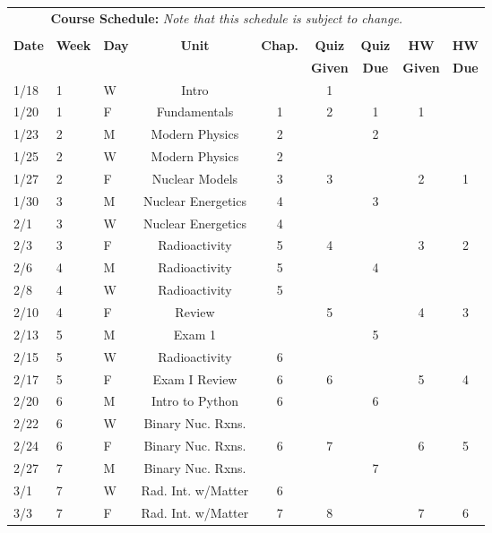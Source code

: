 \documentclass[11pt, a4paper]{article}
\begin{document}
\pagebreak
\FloatBarrier
\renewcommand{\arraystretch}{1}
\begin{table}[h]
\begin{center}
\begin{tabular}{lllcccccc}
\multicolumn{8}{c}{\textbf{Course Schedule:}\textit{ Note that this schedule is
subject to change.}}\\
&&&&&&&&\\
\textbf{Date} & \textbf{Week} & \textbf{Day} & \textbf{Unit} & \textbf{Chap.} & \textbf{Quiz}& \textbf{Quiz} & \textbf{HW} & \textbf{HW}\\
              &  &  &  &  & \textbf{Given} & \textbf{Due} & \textbf{Given} & \textbf{Due}\\ \hline
\hline
1/18 & 1 & W & Intro              &  & 1 &  &  & \\
1/20 & 1 & F & Fundamentals       & 1 & 2 & 1 & 1 &  \\
1/23 & 2 & M & Modern Physics     & 2 &   & 2 & &  \\
1/25 & 2 & W & Modern Physics     & 2 &   &  &  &  \\
1/27 & 2 & F & Nuclear Models     & 3 & 3 &  & 2 & 1  \\
1/30 & 3 & M & Nuclear Energetics & 4 &   & 3 & &  \\
2/1 & 3 & W & Nuclear Energetics  & 4 &   &  &  &  \\
2/3 & 3 & F & Radioactivity       & 5 & 4 &  & 3 & 2 \\
2/6 & 4 & M & Radioactivity       & 5 &   & 4 &  &  \\
2/8 & 4 & W & Radioactivity       & 5 &   &  &  &  \\
2/10 & 4 & F & Review             &   & 5 &  & 4 & 3 \\
2/13 & 5 & M & Exam 1             &   &   & 5  &  &  \\
2/15 & 5 & W & Radioactivity  & 6 &   &  &  &  \\
2/17 & 5 & F & Exam I Review  & 6 & 6 &  & 5 & 4 \\
2/20 & 6 & M & Intro to Python  & 6 &   & 6 &  &  \\
2/22 & 6 & W & Binary Nuc. Rxns.      &  &  &  &  &  \\
2/24 & 6 & F & Binary Nuc. Rxns.  & 6 & 7 &  & 6 & 5  \\
2/27 & 7 & M & Binary Nuc. Rxns. &  &  & 7 &  &  \\
3/1 & 7 & W & Rad. Int. w/Matter  & 6 &  &  &  &  \\
3/3 & 7 & F & Rad. Int. w/Matter  & 7 & 8 &  & 7 & 6 \\

\end{tabular}
\end{center}
\end{table}
\end{document}
